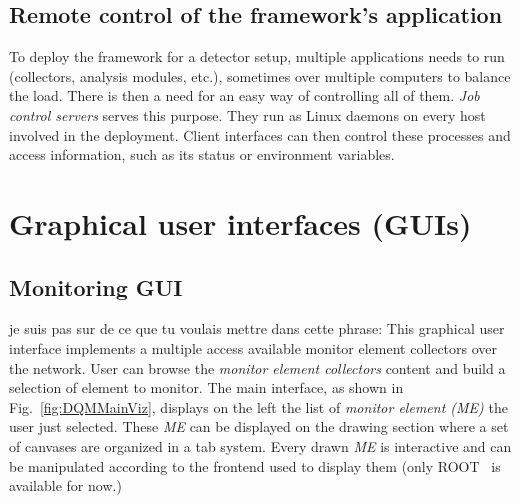 \documentclass[conference]{IEEEtran}
\begin{document}
\subsection{Remote control of the framework's application}
To deploy the framework for a detector setup, multiple applications needs to run (collectors, analysis modules, etc.), sometimes over multiple computers to balance the load. There is then a need for an easy way of controlling all of them. \textit{Job control servers} serves this purpose. They run as Linux daemons on every host involved in the deployment. Client interfaces can then control these processes and access information, such as its status or environment variables.

\section{Graphical user interfaces (GUIs)}

\subsection{Monitoring GUI}

{\color{red} je suis pas sur de ce que tu voulais mettre dans cette phrase: This graphical user interface implements a multiple access available monitor element collectors over the network.} User can browse the \textit{monitor element collectors} content and build a selection of element to monitor. The main interface, as shown in Fig.~\ref{fig:DQMMainViz}, displays on the left the list of \textit{monitor element (ME)} the user just selected. These \textit{ME} can be displayed on the drawing section where a set of canvases are organized in a tab system. Every drawn \textit{ME} is interactive and can be manipulated according to the frontend used to display them (only ROOT~\cite{ROOT} is available for now.)
\end{document}
